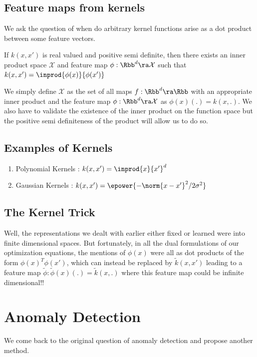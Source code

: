 \documentclass[11pt]{report}
\begin{document}
\subsection{Feature maps from kernels}
We ask the question of when do arbitrary kernel functions arise as a dot product between some feature vectors.
\begin{theorem}
If \(k(x,x')\) is real valued and positive semi definite, then there exists an inner product space \(\mathcal{X}\) and feature map \(\phi: \Rbb^d \ra \mathcal{X}\) such that \(k(x,x')=\inprod{\phi(x)}{\phi(x')}\)
\end{theorem}
\vspace{1mm}
We simply define \(\mathcal{X}\) as the set of all maps \(f: \Rbb^d \ra \Rbb\) with an appropriate inner product and the feature map \(\phi: \Rbb^d \ra \mathcal{X}\) as \(\phi(x)(.)=k(x,.)\).
We also have to validate the existence of the inner product on the function space but the positive semi definiteness of the product will allow us to do so.

\subsection{Examples of Kernels}

\begin{enumerate}[label=\textup{(\alph*)}, leftmargin=*, widest=b, align=left]



\item \label{mpp:gen_a_0} Polynomial Kernels : \(k(x,x')= \inprod{x}{x'}^d\)
\item \label{mpp:gen_a_1} Gaussian Kernels : \(k(x,x')=\epower{-\norm{x-x'}^2/2\sigma^2}\)
 \end{enumerate}


\subsection{The Kernel Trick}
Well, the representations we dealt with earlier either fixed or learned were into finite dimensional spaces. But fortunately, in all the dual formulations of our optimization equations, the mentions of \(\phi(x)\) were all as dot products of the form \(\phi(x)^T\phi(x')\), which can instead be replaced by \(\tilde{k}(x,x')\) leading to a feature map \(\tilde{\phi} : \tilde{\phi}(x)(.)=\tilde{k}(x,.)\) where this feature map could be infinite dimensional!!

\section{Anomaly Detection}
We come back to the original question of anomaly detection and propose another method.
\end{document}
